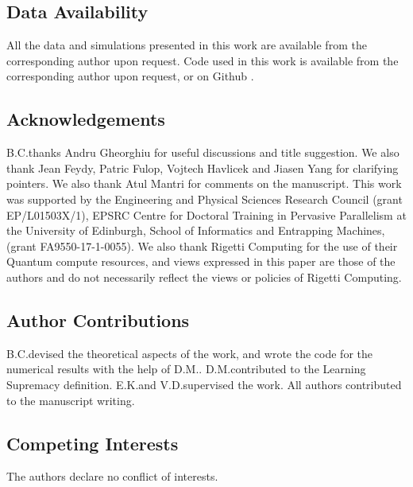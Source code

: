 \documentclass[10.3pt, a4paper ]{article}
\begin{document}

\maketitle

\begin{multicols}{2}







\subsection*{Data Availability}\label{sec:data_availability}
All the data and simulations presented in this work are available from the corresponding author upon request. Code used in this work is available from the corresponding author upon request, or on Github \cite{briancoyle_implementation_2019}.
\subsection*{Acknowledgements}\label{sec:acknowledgements}

B.C.\@ thanks Andru Gheorghiu for useful discussions and title suggestion. We also thank Jean Feydy, Patric Fulop, Vojtech Havlicek and Jiasen Yang for clarifying pointers. We also thank Atul Mantri for comments on the manuscript. This work was supported by the Engineering and Physical Sciences Research Council (grant EP/L01503X/1), EPSRC Centre for Doctoral Training in Pervasive Parallelism at the University of Edinburgh, School of Informatics and Entrapping Machines, (grant FA9550-17-1-0055). We also thank Rigetti Computing for the use of their Quantum compute resources, and views expressed in this paper are those of the authors and do not necessarily reflect the views or policies of Rigetti Computing.

\subsection*{Author Contributions}
B.C.\@ devised the theoretical aspects of the work, and wrote the code for the numerical results with the help of D.M.. D.M.\@ contributed to the Learning Supremacy definition. 
E.K.\@ and V.D.\@ supervised the work. All authors contributed to the manuscript writing. 

\subsection*{Competing Interests}
The authors declare no conflict of interests.

% 


\end{multicols}
\end{document}
